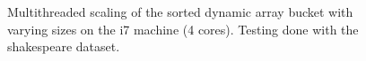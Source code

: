 \begin{landscape}
\begin{figure}[H]
{    }
    \label{fig:ts_i7_shake_sorted}
    \caption{Multithreaded scaling of the sorted dynamic array bucket with varying sizes on the
    i7 machine (4 cores). Testing done with the shakespeare dataset.}
\end{figure}
\begin{figure}[H]
\end{figure}
\end{landscape}
